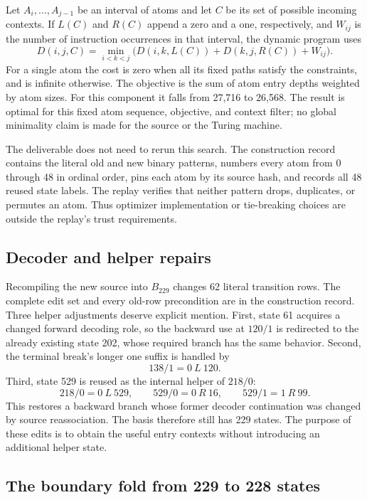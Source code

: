 Let $A_i,\ldots,A_{j-1}$ be an interval of atoms and let $C$ be its set of
possible incoming contexts.  If $L(C)$ and $R(C)$ append a zero and a one,
respectively, and $W_{ij}$ is the number of instruction occurrences in
that interval, the dynamic program uses
\[
 D(i,j,C)=\min_{i<k<j}
 \bigl(D(i,k,L(C))+D(k,j,R(C))+W_{ij}\bigr).
\]
For a single atom the cost is zero when all its fixed paths satisfy the
constraints, and is infinite otherwise.  The objective is the sum of
atom entry depths weighted by atom sizes.  For this component it falls
from 27,716 to 26,568.  The result is optimal for this fixed atom sequence,
objective, and context filter; no global minimality claim is made for
the source or the Turing machine.

The deliverable does not need to rerun this search.  The construction
record contains the literal old and new binary patterns, numbers every
atom from 0 through 48 in ordinal order, pins each atom by its source
hash, and records all 48 reused state labels.  The replay verifies that
neither pattern drops, duplicates, or permutes an atom.  Thus optimizer
implementation or tie-breaking choices are outside the replay's trust
requirements.

\subsection{Decoder and helper repairs}

Recompiling the new source into $B_{229}$ changes 62 literal transition
rows.  The complete edit set and every old-row precondition are in the
construction record.  Three helper adjustments deserve explicit mention.
First, state 61 acquires a changed forward decoding role, so the backward
use at $120/1$ is redirected to the already existing state 202, whose
required branch has the same behavior.  Second, the terminal break's
longer one suffix is handled by
\[
 138/1=0\ L\ 120.
\]
Third, state 529 is reused as the internal helper of $218/0$:
\[
 218/0=0\ L\ 529,\qquad
 529/0=0\ R\ 16,\qquad 529/1=1\ R\ 99.
\]
This restores a backward branch whose former decoder continuation was
changed by source reassociation.  The basis therefore still has 229
states.  The purpose of these edits is to obtain the useful entry
contexts without introducing an additional helper state.

\subsection{The boundary fold from 229 to 228 states}

